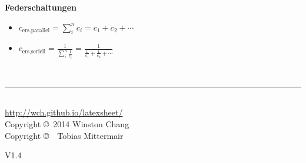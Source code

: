 \documentclass[10pt,a4paper,landscape, hidelinks]{article}
\begin{document}
\begin{multicols*}{3}
\vspace{20pt}

\textbf{Federschaltungen}
\begin{itemize}[leftmargin=*]
        \item [] $c_\text{ers,parallel}=\sum_{i}^{n}c_i=c_1+c_2+\cdots$
        \item [] $c_\text{ers,seriell}=\frac{1}{\sum_{i}^{n}\frac{1}{c_i}}=\frac{1}{\frac{1}{c_1}+\frac{1}{c_2}+\cdots}$
\end{itemize}

\par\vfill\null
\columnbreak

 
\vfill


\tabto{6.3cm}\rule{0.3\linewidth}{0.25pt}\\
\tiny
\tabto{6.3cm}\href{http://wch.github.io/latexsheet/}{http://wch.github.io/latexsheet/}\\
\tabto{6.3cm}Copyright \copyright\ 2014 Winston Chang\\
\tabto{6.3cm}Copyright \copyright\ \the\year\ Tobias Mittermair
\begin{flushright}
        {\normalsize V1.4}\\
\end{flushright}


\end{multicols*}
\end{document}
